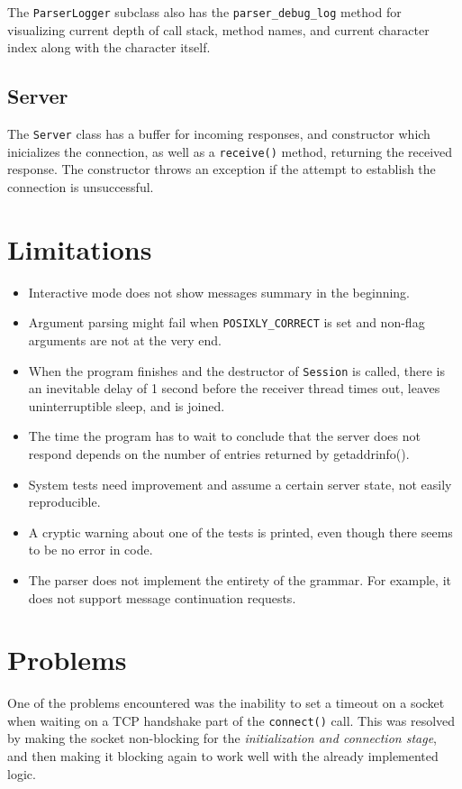 \documentclass[a4]{report}
\begin{document}
The \texttt{ParserLogger} subclass also has the \texttt{parser\_debug\_log} method for visualizing current depth of call stack, method names, and current character index along with the character itself.

\subsection{Server}

The \texttt{Server} class has a buffer for incoming responses, and constructor which inicializes the connection, as well as a \texttt{receive()} method, returning the received response. The constructor throws an exception if the attempt to establish the connection is unsuccessful.

\section{Limitations}

\begin{itemize}
  \item Interactive mode does not show messages summary in the beginning.
  \item Argument parsing might fail when \texttt{POSIXLY\_CORRECT} is set and non-flag arguments are not at the very end.
  \item When the program finishes and the destructor of \texttt{Session} is called, there is an inevitable delay of 1 second before the receiver thread times out, leaves uninterruptible sleep, and is joined.
  \item The time the program has to wait to conclude that the server does not respond depends on the number of entries returned by getaddrinfo().
  \item System tests need improvement and assume a certain server state, not easily reproducible.
  \item A cryptic warning about one of the tests is printed, even though there seems to be no error in code.
  \item The parser does not implement the entirety of the grammar. For example, it does not support message continuation requests.
\end{itemize}

\section{Problems}

One of the problems encountered was the inability to set a timeout on a socket when waiting on a TCP handshake part of the \texttt{connect()} call. This was resolved by making the socket non-blocking for the \textit{initialization and connection stage}, and then making it blocking again to work well with the already implemented logic.\cite{timeout-sof}
\end{document}
